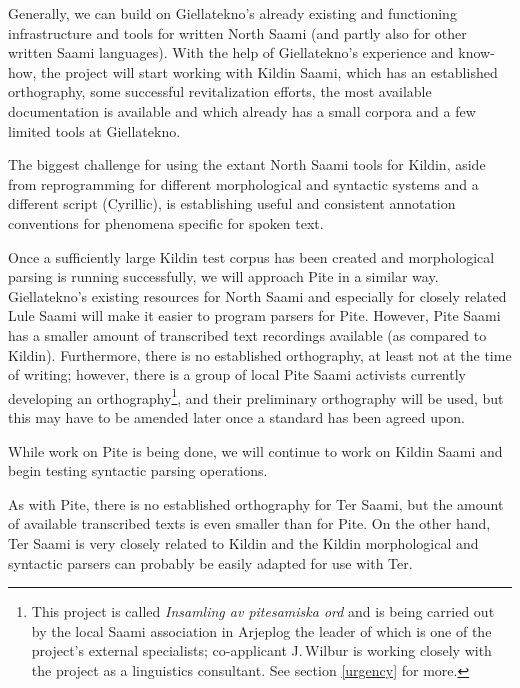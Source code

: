 \documentclass[a4paper,12pt]{article}
\begin{document}
Generally, we can build on Giellatekno's already existing and functioning infrastructure and tools for written North Saami (and partly also for other written Saami languages). With the help of Giellatekno's experience and know-how, the project will start working with Kildin Saami, which has an established orthography, some successful revitalization efforts, the most available documentation is available and which already has a small corpora and a few limited tools at Giellatekno.

The biggest challenge for using the extant North Saami tools for Kildin, aside from reprogramming for different morphological and syntactic systems and a different script (Cyrillic), is establishing useful and consistent annotation conventions for phenomena specific for spoken text.

Once a sufficiently large Kildin test corpus has been created and morphological parsing is running successfully, we will approach Pite in a similar way. Giellatekno's existing resources for North Saami and especially for closely related Lule Saami will make it easier to program parsers for Pite. However, Pite Saami has a smaller amount of transcribed text recordings available (as compared to Kildin). Furthermore, there is no established orthography, at least not at the time of writing; however, there is a group of local Pite Saami activists currently developing an orthography\footnote{This project is called {\it Insamling av pitesamiska ord} and is being carried out by the local Saami association in Arjeplog the leader of which is one of the project's external specialists; co-applicant J.\,Wilbur is working closely with the project as a linguistics consultant. See section \ref{urgency} for more.}, and their preliminary orthography will be used, but this may have to be amended later once a standard has been agreed upon.

While work on Pite is being done, we will continue to work on Kildin Saami and begin testing syntactic parsing operations.

As with Pite, there is no established orthography for Ter Saami, but the amount of available transcribed texts is even smaller than for Pite.  On the other hand, Ter Saami is very closely related to Kildin and the Kildin morphological and syntactic parsers can probably be easily adapted for use with Ter.
\end{document}
